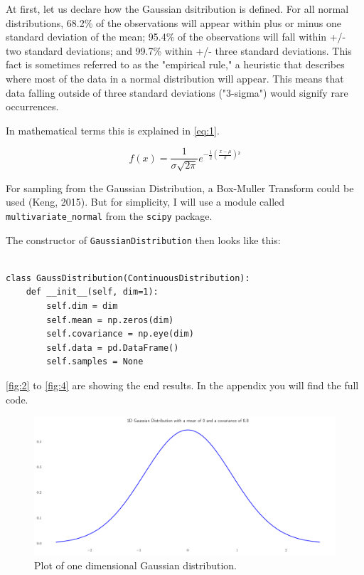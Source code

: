 \documentclass{CPSReport}
\begin{document}
At first, let us declare how the Gaussian dsitribution is defined.
For all normal distributions, 68.2\% of the observations will appear within plus or minus one standard deviation of the mean; 95.4\% of the observations will fall within +/- two standard deviations; and 99.7\% within +/- three standard deviations. This fact is sometimes referred to as the "empirical rule," a heuristic that describes where most of the data in a normal distribution will appear.
This means that data falling outside of three standard deviations ("3-sigma") would signify rare occurrences.

In mathematical terms this is explained in \autoref{eq:1}.

\begin{equation} \label{eq:1}
    f(x)=\frac{1}{\sigma \sqrt{2\pi } } e^{-\frac{1}{2}(\frac{x-\mu}{\sigma})²}
\end{equation}

For sampling from the Gaussian Distribution, a Box-Muller Transform could be used (Keng, 2015).
But for simplicity, I will use a module called \texttt{multivariate_normal} from the \texttt{scipy} package.

The constructor of \texttt{GaussianDistribution} then looks like this:

\begin{verbatim}

class GaussDistribution(ContinuousDistribution):
    def __init__(self, dim=1):
        self.dim = dim
        self.mean = np.zeros(dim)
        self.covariance = np.eye(dim)
        self.data = pd.DataFrame()
        self.samples = None
\end{verbatim}

\autoref{fig:2} to \autoref{fig:4} are showing the end results.
In the appendix you will find the full code.

\begin{figure}[ht]
    \begin{center}
        \includegraphics[width=1\linewidth]{../gaussian1D.pdf}
    \end{center}
    \caption{Plot of one dimensional Gaussian distribution.}
    \label{fig:2}
\end{figure}
\end{document}
